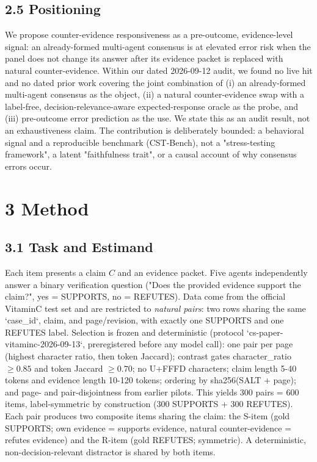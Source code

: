 \documentclass[11pt]{article}
\begin{document}
\subsection{2.5 Positioning}

We propose counter-evidence responsiveness as a pre-outcome, evidence-level signal: an already-formed multi-agent consensus is at elevated error risk when the panel does not change its answer after its evidence packet is replaced with natural counter-evidence. Within our dated 2026-09-12 audit, we found no live hit and no dated prior work covering the joint combination of (i) an already-formed multi-agent consensus as the object, (ii) a natural counter-evidence swap with a label-free, decision-relevance-aware expected-response oracle as the probe, and (iii) pre-outcome error prediction as the use. We state this as an audit result, not an exhaustiveness claim. The contribution is deliberately bounded: a behavioral signal and a reproducible benchmark (CST-Bench), not a "stress-testing framework", a latent "faithfulness trait", or a causal account of why consensus errors occur.

\section{3 Method}

\subsection{3.1 Task and Estimand}

Each item presents a claim $C$ and an evidence packet. Five agents independently answer a binary verification question ("Does the provided evidence support the claim?", yes = SUPPORTS, no = REFUTES). Data come from the official VitaminC test set and are restricted to \emph{natural pairs}: two rows sharing the same `case\_id`, claim, and page/revision, with exactly one SUPPORTS and one REFUTES label. Selection is frozen and deterministic (protocol `cs-paper-vitaminc-2026-09-13`, preregistered before any model call): one pair per page (highest character ratio, then token Jaccard); contrast gates character\_ratio $\geq 0.85$ and token Jaccard $\geq 0.70$; no U+FFFD characters; claim length 5-40 tokens and evidence length 10-120 tokens; ordering by sha256(SALT + page); and page- and pair-disjointness from earlier pilots. This yields 300 pairs = 600 items, label-symmetric by construction (300 SUPPORTS + 300 REFUTES). Each pair produces two composite items sharing the claim: the S-item (gold SUPPORTS; own evidence = supports evidence, natural counter-evidence = refutes evidence) and the R-item (gold REFUTES; symmetric). A deterministic, non-decision-relevant distractor is shared by both items.
\end{document}
